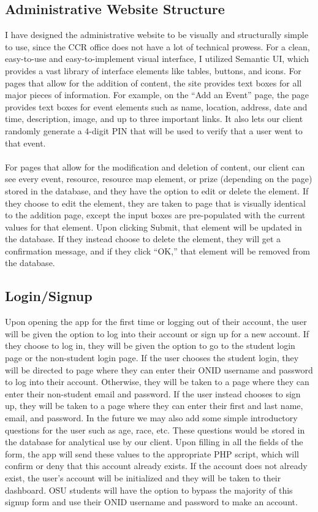 \documentclass[draftclsnofoot, onecolumn, 10pt, compsoc]{IEEEtran}
\begin{document}
      \subsection{Administrative Website Structure}
         I have designed the administrative website to be visually and structurally simple to use, since the CCR office does not have a lot of technical prowess. For a clean, easy-to-use and easy-to-implement visual interface, I utilized Semantic UI, which provides a vast library of interface elements like tables, buttons, and icons. For pages that allow for the addition of content, the site provides text boxes for all major pieces of information. For example, on the “Add an Event” page, the page provides text boxes for event elements such as name, location, address, date and time, description, image, and up to three important links. It also lets our client randomly generate a 4-digit PIN that will be used to verify that a user went to that event. \\ \\
         For pages that allow for the modification and deletion of content, our client can see every event, resource, resource map element, or prize (depending on the page) stored in the database, and they have the option to edit or delete the element. If they choose to edit the element, they are taken to page that is visually identical to the addition page, except the input boxes are pre-populated with the current values for that element. Upon clicking Submit, that element will be updated in the database. If they instead choose to delete the element, they will get a confirmation message, and if they click “OK,” that element will be removed from the database.

      \subsection{Login/Signup}
         Upon opening the app for the first time or logging out of their account, the user will be given the option to log into their account or sign up for a new account. If they choose to log in, they will be given the option to go to the student login page or the non-student login page. If the user chooses the student login, they will be directed to page where they can enter their ONID username and password to log into their account. Otherwise, they will be taken to a page where they can enter their non-student email and password. If the user instead chooses to sign up, they will be taken to a page where they can enter their first and last name, email, and password. In the future we may also add some simple introductory questions for the user such as age, race, etc. These questions would be stored in the database for analytical use by our client. Upon filling in all the fields of the form, the app will send these values to the appropriate PHP script, which will confirm or deny that this account already exists. If the account does not already exist, the user’s account will be initialized and they will be taken to their dashboard. OSU students will have the option to bypass the majority of this signup form and use their ONID username and password to make an account.
\end{document}
